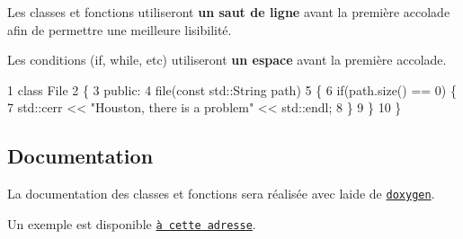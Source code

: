 Les classes et fonctions utiliseront {\bfseries un saut de ligne} avant la première accolade afin de permettre une meilleure lisibilité.

Les conditions (if, while, etc) utiliseront {\bfseries un espace} avant la première accolade.


\begin{DoxyCode}
1 class File
2 \{
3     public:
4         file(const std::String path)
5         \{
6             if(path.size() == 0) \{
7                 std::cerr << "Houston, there is a problem" << std::endl;
8             \}
9         \}
10 \}
\end{DoxyCode}


\subsection*{Documentation}

La documentation des classes et fonctions sera réalisée avec l\textquotesingle{}aide de \href{http://www.stack.nl/~dimitri/doxygen}{\tt doxygen}.

Un exemple est disponible \href{http://www.stack.nl/~dimitri/doxygen/manual/docblocks.html}{\tt à cette adresse}. 